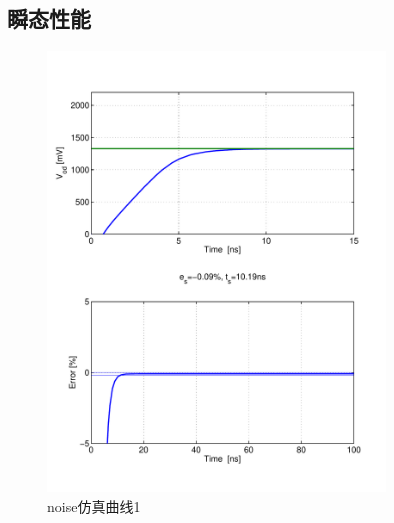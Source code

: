 \documentclass[a4paper]{article}
\begin{document}
\subsection{瞬态性能}

\begin{figure}[htb]
    \begin{center}
        \includegraphics[width=0.8\textwidth]{slow/tran1.pdf}
    \end{center}
    \caption{noise仿真曲线1}
    \label{slowtran1}
\end{figure}
\end{document}

